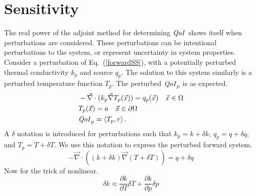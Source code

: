 \documentclass{article}
\newcommand{\vx}{\vec{x}}
\newcommand{\bra}{\left\langle}
\newcommand{\ket}{\right\rangle}
\renewcommand{\div}{\vec{\nabla} \cdot}
\newcommand{\grad}{\vec{\nabla}}
\newcommand{\qoi}{{\it QoI}\xspace}
\begin{document}
\section{Sensitivity}
The real power of the adjoint method for determining $\qoi$ shows itself when perturbations are considered. These perturbations can be intentional perturbations to the system, or represent uncertainty in system properties. Consider a perturbation of Eq.~(\ref{forwardSS}), with a potentially perturbed thermal conductivity $k_p$ and source $q_p$. The solution to this system similarly is a perturbed temperature function $T_p$. The perturbed $\qoi_p$ is as expected.
\begin{equation}
\label{forwardSSpert}
\begin{split}
& - \div ( k_p \grad T_p(\vx) ) = q_p(\vx) \quad \vx \in \Omega \\
&T_p(\vx)=a \quad \vx \in \partial \Omega \\
&\qoi_p = \bra T_p , r \ket.
\end{split}
\end{equation}
A $\delta$ notation is introduced for perturbations such that $k_p = k + \delta k$, $q_p = q + \delta q$, and $T_p =  T + \delta T$. We use this notation to express the perturbed forward system.
\begin{equation}
- \div ( (k+\delta k) \grad (T + \delta T) ) = q + \delta q 
\end{equation}
Now for the trick of nonlinear.
\begin{equation}
\delta k \approx \frac{\partial k}{\partial T} \delta T + \frac{\partial k}{\partial p} \delta p 
\end{equation}
\end{document}
